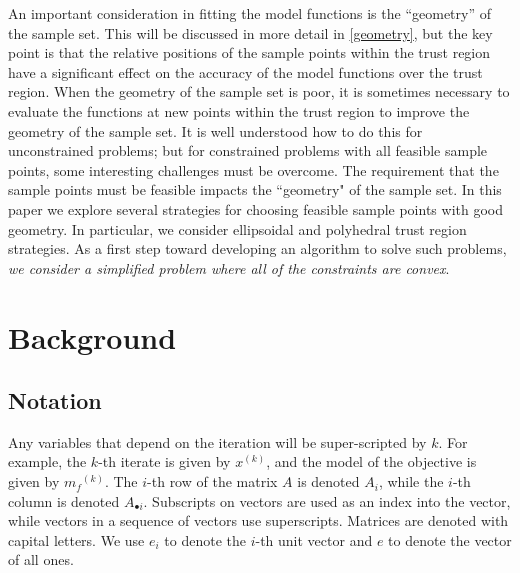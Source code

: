 \documentclass{article}
\theoremstyle{case}
\numberwithin{theorem}{subsection}
\newcommand{\mfk}{{{m}_f}^{(k)}}
\newcommand{\xk}{x^{(k)}}
\begin{document}
An important consideration in fitting the model functions is the ``geometry'' of the sample set.
This will be discussed in more detail in \cref{geometry}, but the key point is that the relative positions of the sample points within the trust region have a significant effect on the accuracy of the model functions over the trust region.
When the geometry of the sample set is poor, it is sometimes necessary to evaluate the functions at new points within the trust region to improve the geometry of the sample set.
It is well understood how to do this for unconstrained problems; but for constrained problems with all feasible sample points, some interesting challenges must be overcome.
\color{red}
The requirement that the sample points must be feasible impacts the ``geometry" of the sample set.
In this paper we explore several strategies for choosing feasible sample points with good geometry.
In particular, we consider ellipsoidal and polyhedral trust region strategies.
\color{black}
As a first step toward developing an algorithm to solve such problems, \emph{we consider a simplified problem where all of the constraints are convex}.


\section{Background}

\subsection{Notation}

Any variables that depend on the iteration will be super-scripted by $k$.
For example, the $k$-th iterate is given by $\xk$, and the model of the objective is given by $\mfk$.
The $i$-th row of the matrix $A$ is denoted $A_i$, while the $i$-th column is denoted $A_{\bullet i}$.
Subscripts on vectors are used as an index into the vector, while vectors in a sequence of vectors use superscripts.
Matrices are denoted with capital letters.
We use $e_i$ to denote the $i$-th unit vector and $e$ to denote the vector of all ones.
\end{document}
